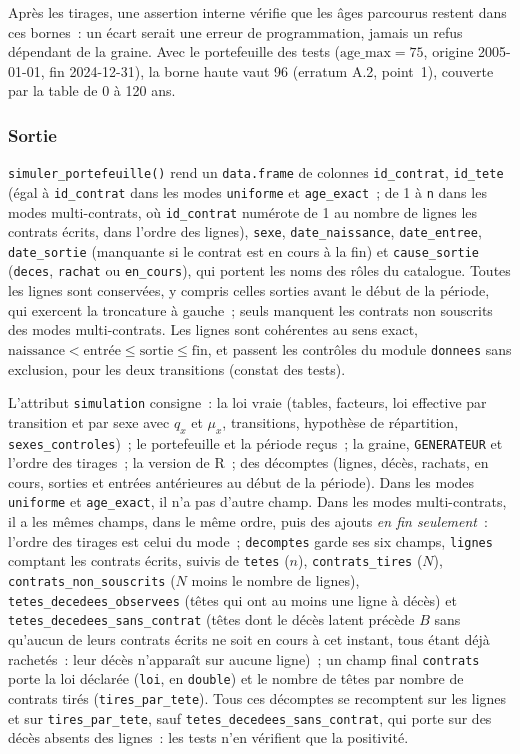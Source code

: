 \documentclass[a4paper,11pt]{article}
\newcommand{\code}[1]{\texttt{\small #1}}
\begin{document}
\noindent
Après les tirages, une assertion interne vérifie que les âges parcourus
restent dans ces bornes~: un écart serait une erreur de programmation, jamais
un refus dépendant de la graine. Avec le portefeuille des tests
($\text{age\_max} = 75$, origine 2005-01-01, fin 2024-12-31), la borne haute
vaut 96 (erratum A.2, point~1), couverte par la table de 0 à 120 ans.

\subsubsection*{Sortie}

{\sloppy{} \code{simuler\_portefeuille()} rend un \code{data.frame} de colonnes
\code{id\_contrat}, \code{id\_tete} (égal à \code{id\_contrat} dans les modes
\code{uniforme} et \code{age\_exact}~; de 1 à \code{n} dans les modes
multi-contrats, où \code{id\_contrat} numérote de 1 au nombre de lignes les
contrats écrits, dans l'ordre des lignes), \code{sexe},
\code{date\_naissance}, \code{date\_entree}, \code{date\_sortie} (manquante si
le contrat est en cours à la fin) et \code{cause\_sortie} (\code{deces},
\code{rachat} ou \code{en\_cours}), qui portent les noms des rôles du
catalogue. Toutes les lignes sont conservées, y compris celles sorties avant
le début de la période, qui exercent la troncature à gauche~; seuls manquent
les contrats non souscrits des modes multi-contrats. Les lignes sont
cohérentes au sens exact, $\text{naissance} < \text{entrée} \le \text{sortie}
\le \text{fin}$, et passent les contrôles du module \code{donnees} sans
exclusion, pour les deux transitions (constat des tests).\par}

\medskip
L'attribut \code{simulation} consigne~: la loi vraie (tables, facteurs, loi
effective par transition et par sexe avec $q_x$ et $\mu_x$, transitions,
hypothèse de répartition, \code{sexes\_controles})~; le portefeuille et la
période reçus~; la graine, \code{GENERATEUR} et l'ordre des tirages~; la
version de R~; des décomptes (lignes, décès, rachats, en cours, sorties et
entrées antérieures au début de la période). Dans les modes
\code{uniforme} et \code{age\_exact}, il n'a pas d'autre champ. Dans les
modes multi-contrats, il a les mêmes champs, dans le même ordre, puis des
ajouts \emph{en fin seulement}~: l'ordre des tirages est celui du mode~;
\code{decomptes} garde ses six champs, \code{lignes} comptant les contrats
écrits, suivis de \code{tetes} ($n$), \code{contrats\_tires} ($N$),
\code{contrats\_non\_souscrits} ($N$ moins le nombre de lignes),
\code{tetes\_decedees\_observees} (têtes qui ont au moins une ligne à
décès) et \code{tetes\_decedees\_sans\_contrat} (têtes dont le décès latent
précède $B$ sans qu'aucun de leurs contrats écrits ne soit en cours à cet
instant, tous étant déjà rachetés~: leur décès n'apparaît sur aucune
ligne)~; un champ final \code{contrats} porte la loi déclarée
(\code{loi}, en \code{double}) et le nombre de têtes par nombre de contrats
tirés (\code{tires\_par\_tete}). Tous ces décomptes se recomptent sur les
lignes et sur \code{tires\_par\_tete}, sauf
\code{tetes\_decedees\_sans\_contrat}, qui porte sur des décès absents des
lignes~: les tests n'en vérifient que la positivité.
\end{document}
